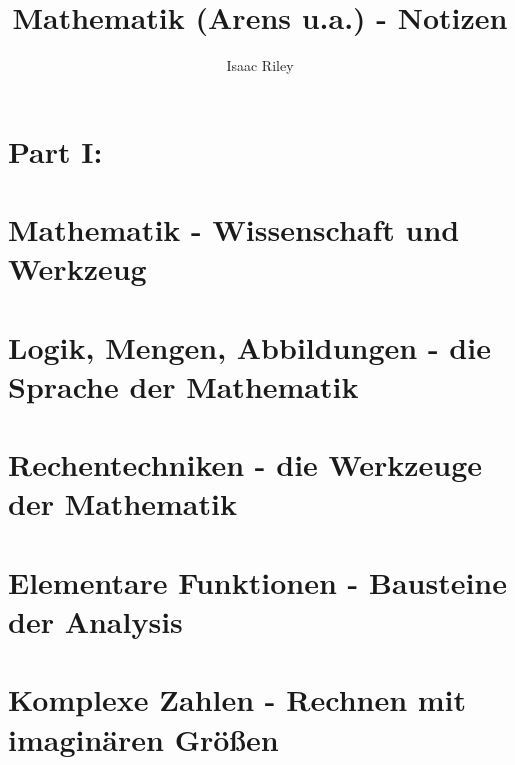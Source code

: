 \documentclass[a4paper]{article}
\title{Mathematik (Arens u.a.) - Notizen}
\author{Isaac Riley}
\begin{document}
\maketitle
\tableofcontents
\newpage

\section*{Part I: }

\section{Mathematik - Wissenschaft und Werkzeug}

\subsection{}

\subsubsection{}


\section{Logik, Mengen, Abbildungen - die Sprache der Mathematik}

\section{Rechentechniken - die Werkzeuge der Mathematik}

\section{Elementare Funktionen - Bausteine der Analysis}

\section{Komplexe Zahlen - Rechnen mit imaginären Größen}
\end{document}
